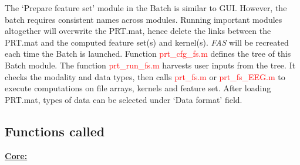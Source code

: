 The `Prepare feature set' module in the Batch is similar to GUI. However, the batch requires consistent names across modules. Running important modules altogether will overwrite the PRT.mat, hence delete the links between the PRT.mat and the computed feature set(s) and kernel(s). \textit{FAS} will be recreated each time the Batch is launched.  Function \textcolor{red}{prt\_cfg\_fs.m} defines the tree of this Batch module. The function \textcolor{red}{prt\_run\_fs.m} harvests user inputs from the tree. It checks the modality and data types, then calls \textcolor{red}{prt\_fs.m} or \textcolor{red}{prt\_fs\_EEG.m} to execute computations on file arrays, kernels and feature set. After loading PRT.mat, types of data can be selected under ‘Data format’ field. 



\subsection{Functions called}

\textbf{\underline{Core:}}

